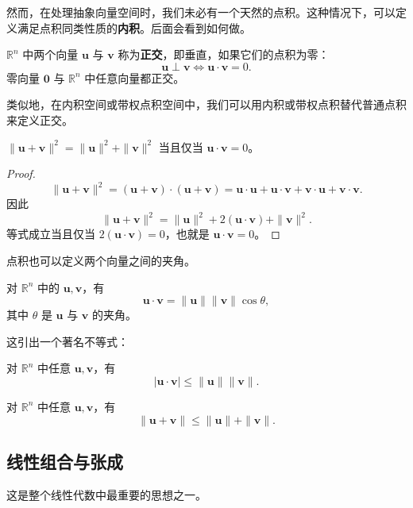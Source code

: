 然而，在处理抽象向量空间时，我们未必有一个天然的点积。这种情况下，可以定义满足点积同类性质的\textbf{内积}。后面会看到如何做。

\begin{definition}[正交性]
$\mathbb{R}^n$ 中两个向量 $\mathbf{u}$ 与 $\mathbf{v}$ 称为\textbf{正交}，即垂直，如果它们的点积为零：
\[ \mathbf{u}\perp\mathbf{v}\iff \mathbf{u}\cdot\mathbf{v}=0. \]
零向量 $\mathbf{0}$ 与 $\mathbb{R}^n$ 中任意向量都正交。
\end{definition}

类似地，在内积空间或带权点积空间中，我们可以用内积或带权点积替代普通点积来定义正交。

\begin{theorem}[勾股定理]
$\|\mathbf{u}+\mathbf{v}\|^2=\|\mathbf{u}\|^2+\|\mathbf{v}\|^2$ 当且仅当 $\mathbf{u}\cdot\mathbf{v}=0$。
\end{theorem}
\begin{proof}
\[
\|\mathbf{u}+\mathbf{v}\|^2=(\mathbf{u}+\mathbf{v})\cdot(\mathbf{u}+\mathbf{v})
=\mathbf{u}\cdot\mathbf{u}+\mathbf{u}\cdot\mathbf{v}+\mathbf{v}\cdot\mathbf{u}+\mathbf{v}\cdot\mathbf{v}.
\]
因此
\[
\|\mathbf{u}+\mathbf{v}\|^2=\|\mathbf{u}\|^2+2(\mathbf{u}\cdot\mathbf{v})+\|\mathbf{v}\|^2.
\]
等式成立当且仅当 $2(\mathbf{u}\cdot\mathbf{v})=0$，也就是 $\mathbf{u}\cdot\mathbf{v}=0$。
\end{proof}

点积也可以定义两个向量之间的夹角。

\begin{theorem}
对 $\mathbb{R}^n$ 中的 $\mathbf{u},\mathbf{v}$，有
\[ \mathbf{u}\cdot\mathbf{v}=\|\mathbf{u}\|\|\mathbf{v}\|\cos\theta, \]
其中 $\theta$ 是 $\mathbf{u}$ 与 $\mathbf{v}$ 的夹角。
\end{theorem}
这引出一个著名不等式：
\begin{theorem}[柯西--施瓦茨不等式]
对 $\mathbb{R}^n$ 中任意 $\mathbf{u},\mathbf{v}$，有
\[ |\mathbf{u}\cdot\mathbf{v}|\leq \|\mathbf{u}\|\|\mathbf{v}\|. \]
\end{theorem}
\begin{theorem}[三角不等式]
对 $\mathbb{R}^n$ 中任意 $\mathbf{u},\mathbf{v}$，有
\[ \|\mathbf{u}+\mathbf{v}\|\leq \|\mathbf{u}\|+\|\mathbf{v}\|. \]
\end{theorem}

\subsection{线性组合与张成}

这是整个线性代数中最重要的思想之一。

